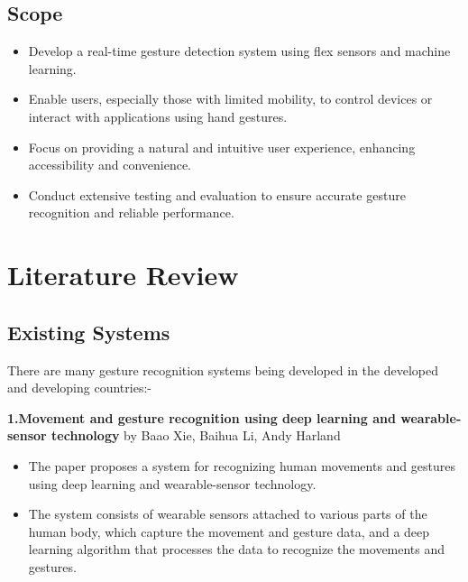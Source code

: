 \documentclass[a4paper,12pt,oneside]{report}
\begin{document}
	
 \section{Scope}
	
 \begin{itemize}
    \item Develop a real-time gesture detection system using flex sensors and machine learning.
    \item Enable users, especially those with limited mobility, to control devices or interact with applications using hand gestures.
    \item Focus on providing a natural and intuitive user experience, enhancing accessibility and convenience.
    \item Conduct extensive testing and evaluation to ensure accurate gesture recognition and reliable performance.
\end{itemize}

	
 \newpage
 \chapter{Literature Review}
 \label{chap:Literature Review}
 \vspace*{-0.4cm}
 \section{Existing Systems}
 \par
 There are many gesture recognition systems being developed in the developed and developing
countries:-
\par
{\textbf{ 1.Movement and gesture recognition using deep learning and wearable-sensor technology}}
 by Baao Xie, Baihua Li, Andy Harland
  \begin{itemize}
    \item The paper proposes a system for recognizing human movements and gestures using deep learning and wearable-sensor technology.
    \item The system consists of wearable sensors attached to various parts of the human body, which capture the movement and gesture data, and a deep learning algorithm that processes the data to recognize the movements and gestures.

   
\end{itemize}
\end{document}
